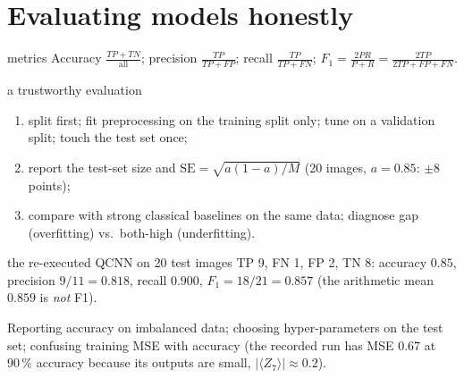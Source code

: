 \documentclass[11pt,a4paper,openany]{book}
\newcounter{wex}[chapter]
\begin{document}
\section{Evaluating models honestly}
\begin{defn}{metrics}
Accuracy $\frac{TP + TN}{\text{all}}$; precision $\frac{TP}{TP + FP}$; recall $\frac{TP}{TP + FN}$; $F_1 = \frac{2PR}{P + R} = \frac{2TP}{2TP + FP + FN}$.
\end{defn}
\begin{method}{a trustworthy evaluation}
\begin{enumerate}[itemsep=1pt]
\item split first; fit preprocessing on the training split only; tune on a validation split; touch the test set once;
\item report the test-set size and $\mathrm{SE} = \sqrt{a(1 - a)/M}$ (20 images, $a = 0.85$: $\pm8$ points);
\item compare with strong classical baselines on the same data; diagnose gap (overfitting) vs.\ both-high (underfitting).
\end{enumerate}
\end{method}
\begin{wexample}{the re-executed QCNN on 20 test images}
TP 9, FN 1, FP 2, TN 8: accuracy $0.85$, precision $9/11 = 0.818$, recall $0.900$, $F_1 = 18/21 = 0.857$
(the arithmetic mean $0.859$ is \emph{not} F1).
\end{wexample}
\begin{trap}
Reporting accuracy on imbalanced data; choosing hyper-parameters on the test set; confusing training MSE with accuracy
(the recorded run has MSE $0.67$ at $90\,\%$ accuracy because its outputs are small, $|\langle Z_7\rangle| \approx 0.2$).
\end{trap}

\end{document}
